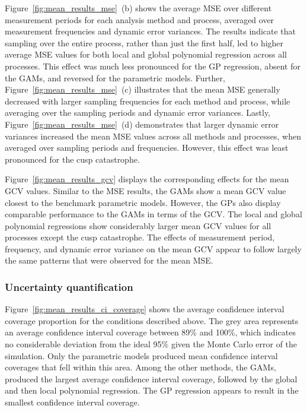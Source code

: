 \documentclass[man, floatsintext]{apa7}
\begin{document}
Figure~\ref{fig:mean_results_mse}~(b) shows the average MSE over different
measurement periods for each analysis method and process, averaged over
measurement frequencies and dynamic error variances. The results indicate that
sampling over the entire process, rather than just the first half, led to
higher average MSE values for both local and global polynomial regression
across all processes. This effect was much less pronounced for the GP
regression, absent for the GAMs, and reversed for the parametric models.
Further, Figure~\ref{fig:mean_results_mse}~(c) illustrates that the mean MSE
generally decreased with larger sampling frequencies for each method and
process, while averaging over the sampling periods and dynamic error variances.
Lastly, Figure~\ref{fig:mean_results_mse}~(d) demonstrates that larger dynamic
error variances increased the mean MSE values across all methods and processes,
when averaged over sampling periods and frequencies. However, this effect was
least pronounced for the cusp catastrophe.

Figure~\ref{fig:mean_results_gcv} displays the corresponding effects for the
mean GCV values. Similar to the MSE results, the GAMs show a mean GCV value
closest to the benchmark parametric models. However, the GPs also display
comparable performance to the GAMs in terms of the GCV\@. The local and
global polynomial regressions show considerably larger mean GCV values for
all processes except the cusp catastrophe. The effects of
measurement period, frequency, and dynamic error variance on the mean GCV
appear to follow largely the same patterns that were observed for the mean
MSE\@.

\begin{sidewaysfigure*}[htbp]
  \caption{Mean GCV effects across all processes, analysis
    methods, and simulation conditions}
  \label{fig:mean_results_gcv}
\end{sidewaysfigure*}

\subsubsection{Uncertainty quantification}

Figure~\ref{fig:mean_results_ci_coverage} shows the average confidence interval
coverage proportion for the conditions described above. The grey area
represents an average confidence interval coverage between 89\% and 100\%,
which indicates no considerable deviation from the ideal 95\% given the Monte
Carlo error of the simulation. Only the parametric models produced mean
confidence interval coverages that fell within this area. Among the other
methods, the GAMs, produced the largest average confidence interval coverage,
followed by the global and then local polynomial regression. The GP regression
appears to result in the smallest confidence interval coverage.
\end{document}
